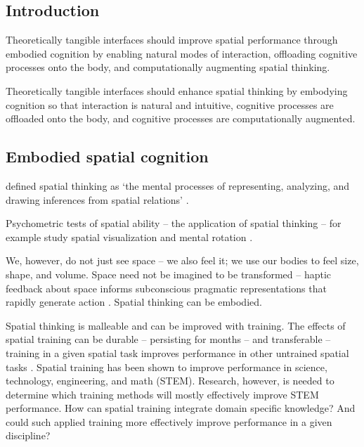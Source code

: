 \subsection{Introduction}
Theoretically tangible interfaces 
should improve spatial performance 
through embodied cognition by 
enabling natural modes of interaction, 
offloading cognitive processes onto the body, 
and computationally augmenting spatial thinking.

Theoretically tangible interfaces 
should enhance spatial thinking 
by embodying cognition so that 
interaction is natural and intuitive,
cognitive processes are offloaded onto the body,
and cognitive processes are computationally augmented.


\subsection{Embodied spatial cognition}



\citeauthor{Uttal2013} defined spatial thinking as 
`the mental processes of representing, analyzing, and drawing inferences from spatial relations' \citeyearpar{Uttal2013}. 


Psychometric tests of spatial ability -- the application of spatial thinking -- for example study spatial visualization and mental rotation \citep{Uttal2013,Uttal2013a,Ormand2014}.

We, however, do not just see space -- we also feel it; we use our bodies to feel size, shape, and volume. 
Space need not be imagined to be transformed -- haptic feedback about space informs subconscious pragmatic representations that rapidly generate action \citep{Jeannerod1997}. Spatial thinking can be embodied.

Spatial thinking is malleable and can be improved with training. 
The effects of spatial training can be durable -- persisting for months -- and transferable -- training in a given spatial task improves performance in other untrained spatial tasks \citep{Uttal2013}. 
Spatial training has been shown to improve performance in science, technology, engineering, and math (STEM). 
Research, however, is needed to determine which training methods will mostly effectively improve STEM performance. 
How can spatial training integrate domain specific knowledge? And could such applied training more effectively improve performance in a given discipline? \citep{Uttal2013} 


